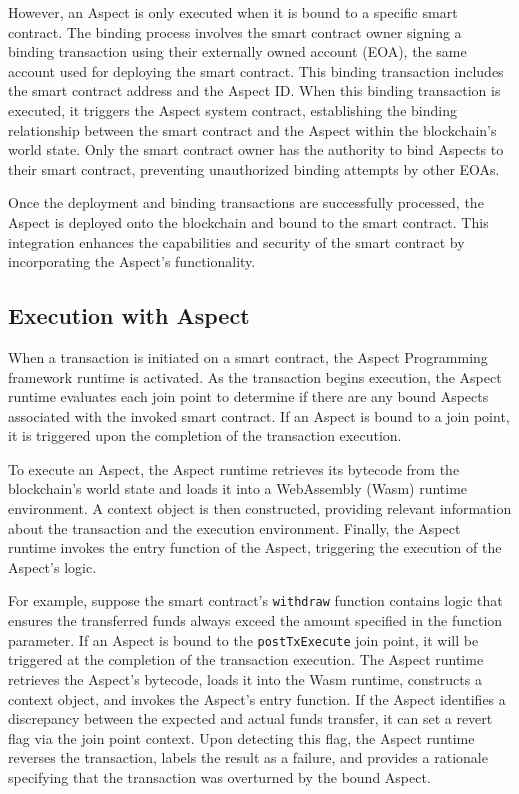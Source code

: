 However, an Aspect is only executed when it is bound to a specific smart contract. The binding process involves the smart contract owner signing a binding transaction using their externally owned account (EOA), the same account used for deploying the smart contract. This binding transaction includes the smart contract address and the Aspect ID. When this binding transaction is executed, it triggers the Aspect system contract, establishing the binding relationship between the smart contract and the Aspect within the blockchain's world state. Only the smart contract owner has the authority to bind Aspects to their smart contract, preventing unauthorized binding attempts by other EOAs.

Once the deployment and binding transactions are successfully processed, the Aspect is deployed onto the blockchain and bound to the smart contract. This integration enhances the capabilities and security of the smart contract by incorporating the Aspect's functionality.

\subsection{Execution with Aspect}
When a transaction is initiated on a smart contract, the Aspect Programming framework runtime is activated. As the transaction begins execution, the Aspect runtime evaluates each join point to determine if there are any bound Aspects associated with the invoked smart contract. If an Aspect is bound to a join point, it is triggered upon the completion of the transaction execution.

To execute an Aspect, the Aspect runtime retrieves its bytecode from the blockchain's world state and loads it into a WebAssembly (Wasm) runtime environment. A context object is then constructed, providing relevant information about the transaction and the execution environment. Finally, the Aspect runtime invokes the entry function of the Aspect, triggering the execution of the Aspect's logic.

For example, suppose the smart contract's \texttt{withdraw} function contains logic that ensures the transferred funds always exceed the amount specified in the function parameter. If an Aspect is bound to the \texttt{postTxExecute} join point, it will be triggered at the completion of the transaction execution. The Aspect runtime retrieves the Aspect's bytecode, loads it into the Wasm runtime, constructs a context object, and invokes the Aspect's entry function. If the Aspect identifies a discrepancy between the expected and actual funds transfer, it can set a revert flag via the join point context. Upon detecting this flag, the Aspect runtime reverses the transaction, labels the result as a failure, and provides a rationale specifying that the transaction was overturned by the bound Aspect.

